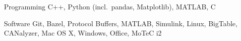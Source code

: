 
\begin{cvskills}
  \cvskill%
    {Programming}
    {C++, Python (incl.\ pandas, Matplotlib), MATLAB, C}

  \cvskill%
    {Software}
    {Git, Bazel, Protocol Buffers, MATLAB, Simulink, Linux, BigTable, CANalyzer, Mac OS X, Windows, Office, MoTeC i2}
\end{cvskills}
